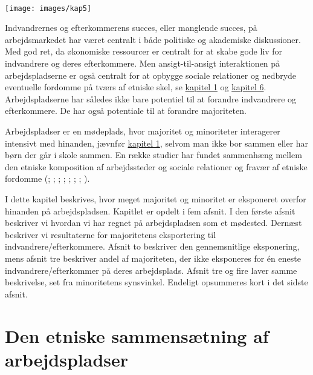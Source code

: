 \documentclass[
]{book}
\begin{document}
~~~~

\texttt{[image: images/kap5]}

\newpage

Indvandrernes og efterkommerens succes, eller manglende succes, på arbejdsmarkedet har været centralt i både politiske og akademiske diskussioner. Med god ret, da økonomiske ressourcer er centralt for at skabe gode liv for indvandrere og deres efterkommere. Men ansigt-til-ansigt interaktionen på arbejdspladserne er også centralt for at opbygge sociale relationer og nedbryde eventuelle fordomme på tværs af etniske skel, se \hyperref[kap1]{kapitel 1} og \hyperref[kap6]{kapitel 6}. Arbejdspladserne har således ikke bare potentiel til at forandre indvandrere og efterkommere. De har også potentiale til at forandre majoriteten.

Arbejdspladser er en mødeplads, hvor majoritet og minoriteter interagerer intensivt med hinanden, jævnfør \hyperref[kap1]{kapitel 1}, selvom man ikke bor sammen eller har børn der går i skole sammen. En række studier har fundet sammenhæng mellem den etniske komposition af arbejdssteder og sociale relationer og fravær af etniske fordomme (; ; ; ; ; ; ; ).

I dette kapitel beskrives, hvor meget majoritet og minoritet er eksponeret overfor hinanden på arbejdspladsen. Kapitlet er opdelt i fem afsnit. I den første afsnit beskriver vi hvordan vi har regnet på arbejdspladsen som et mødested. Dernæst beskriver vi resultaterne for majoritetens eksportering til indvandrere/efterkommere. Afsnit to beskriver den gennemsnitlige eksponering, mens afsnit tre beskriver andel af majoriteten, der ikke eksponeres for én eneste indvandrere/efterkommer på deres arbejdsplads. Afsnit tre og fire laver samme beskrivelse, set fra minoritetens synsvinkel. Endeligt opsummeres kort i det sidste afsnit.

\section{Den etniske sammensætning af arbejdspladser}\label{den-etniske-sammensuxe6tning-af-arbejdspladser}
\end{document}
